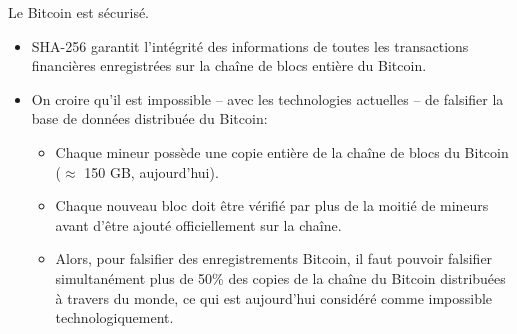 

\begin{frame}{\LARGE Le Bitcoin est s\'ecuris\'e.}

\normalsize

\begin{itemize}
\item
	SHA-256 garantit l'int\'egrit\'e des informations de
	toutes les transactions financi\`eres enregistr\'ees
	sur la cha\^ine de blocs enti\`ere du Bitcoin.

\vskip 0.4cm
\item
	On croire qu'il est impossible -- avec les technologies actuelles --
	de falsifier la base de donn\'ees {\color{red}distribu\'ee} du Bitcoin:
	\vskip 0.05cm
	\begin{itemize}
	\item
		Chaque mineur poss\`ede une copie enti\`ere de la cha\^ine de blocs du Bitcoin ($\approx$ 150 GB, aujourd'hui).
	\vskip 0.15cm
	\item
		Chaque nouveau bloc doit \^etre v\'erifi\'e par plus de la moiti\'e de mineurs
		avant d'\^etre ajout\'e officiellement sur la cha\^ine.
	\vskip 0.15cm
	\item
		Alors, pour falsifier des enregistrements Bitcoin, il faut pouvoir falsifier
		{\color{red}simultan\'ement plus de 50\%} des copies
		de la cha\^ine du Bitcoin distribu\'ees \`a travers du monde,
		ce qui est aujourd'hui consid\'er\'e comme impossible technologiquement.
	\end{itemize}
\end{itemize}

\end{frame}
\normalsize

